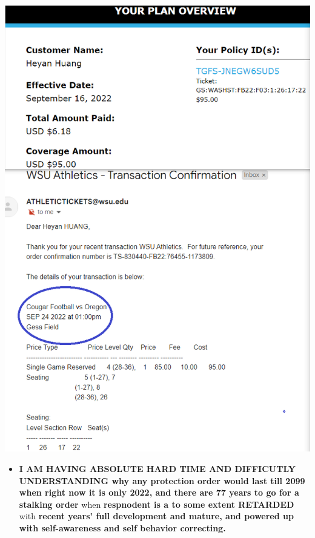 \documentclass[9pt, b5paper]{article}
\begin{document}
\includegraphics[width=.9\linewidth]{./pic/dearCousin_20220919_221744.png}
\begin{itemize}
\item \textbf{I AM HAVING ABSOLUTE HARD TIME AND DIFFICUTLY UNDERSTANDING why any protection order would last till 2099 when right now it is only 2022, and there are 77 years to go for a stalking order} when \textbf{respnodent is a to some extent RETARDED} with \textbf{recent years' full development and mature, and powered up with self-awareness and self behavior correcting.}
\end{itemize}
\end{document}
